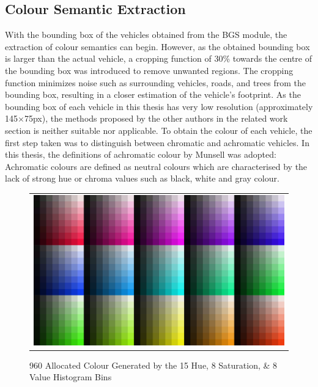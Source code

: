 \subsection{Colour Semantic Extraction }
\label{section:versionOneColorExtract}

With the bounding box of the vehicles obtained from the BGS module, the extraction of colour semantics can begin.
However, as the obtained bounding box is larger than the actual vehicle, a cropping function of 30\% towards the centre of the bounding box was introduced to remove unwanted regions.
The cropping function minimizes noise such as surrounding vehicles, roads, and trees from the bounding box, resulting in a closer estimation of the vehicle's footprint.
As the bounding box of each vehicle in this thesis has very low resolution (approximately 145$\times$75px), the methods proposed by the other authors in the related work section is neither suitable nor applicable.
To obtain the colour of each vehicle, the first step taken was to distinguish between chromatic and achromatic vehicles.
In this thesis, the definitions of achromatic colour by Munsell was adopted: Achromatic colours are defined as neutral colours which are characterised by the lack of strong hue or chroma values such as black, white and gray colour.

\begin{figure}[htb!]
  \centering
\begin{tabular}{c}
 \includegraphics[width=0.7\linewidth]{image/retrievalOne/all.png} \\
\end{tabular}
    \caption{960 Allocated Colour Generated by the 15 Hue, 8 Saturation, \& 8 Value Histogram Bins} \label{fig:hsvAllocated}
\end{figure}

